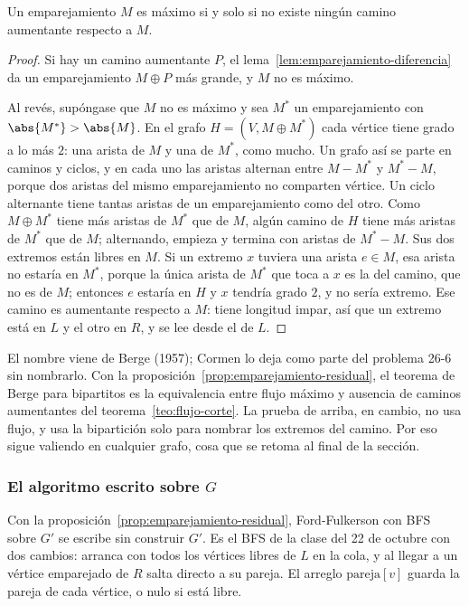 \documentclass[11pt,letterpaper]{article}
\begin{document}
\begin{teorema}[Berge]
  \label{teo:emparejamiento-berge}
  Un emparejamiento $M$ es máximo si y solo si no existe ningún
  camino aumentante respecto a $M$.
\end{teorema}

\begin{proof}
  Si hay un camino aumentante $P$, el
  lema~\ref{lem:emparejamiento-diferencia} da un emparejamiento
  $M \oplus P$ más grande, y $M$ no es máximo.

  Al revés, supóngase que $M$ no es máximo y sea $M^*$ un
  emparejamiento con $\abs{M^*} > \abs{M}$. En el grafo
  $H = (V, M \oplus M^*)$ cada vértice tiene grado a lo más $2$: una
  arista de $M$ y una de $M^*$, como mucho. Un grafo así se parte en
  caminos y ciclos, y en cada uno las aristas alternan entre
  $M - M^*$ y $M^* - M$, porque dos aristas del mismo emparejamiento
  no comparten vértice. Un ciclo alternante tiene tantas aristas de un
  emparejamiento como del otro. Como $M \oplus M^*$ tiene más aristas
  de $M^*$ que de $M$, algún camino de $H$ tiene más aristas de $M^*$
  que de $M$; alternando, empieza y termina con aristas de $M^* - M$.
  Sus dos extremos están libres en $M$. Si un extremo $x$ tuviera una
  arista $e \in M$, esa arista no estaría en $M^*$, porque la única
  arista de $M^*$ que toca a $x$ es la del camino, que no es de $M$;
  entonces $e$ estaría en $H$ y $x$ tendría grado $2$, y no sería
  extremo. Ese camino es aumentante respecto a $M$: tiene longitud
  impar, así que un extremo está en $L$ y el otro en $R$, y se lee
  desde el de $L$.
\end{proof}

El nombre viene de Berge (1957); Cormen lo deja como parte del
problema 26-6 sin nombrarlo. Con la
proposición~\ref{prop:emparejamiento-residual}, el teorema de Berge para
bipartitos es la equivalencia entre flujo máximo y ausencia de
caminos aumentantes del teorema~\ref{teo:flujo-corte}. La prueba de
arriba, en cambio, no usa flujo, y usa la bipartición solo para
nombrar los extremos del camino. Por eso sigue valiendo en cualquier
grafo, cosa que se retoma al final de la sección.

\subsubsection*{El algoritmo escrito sobre $G$}

Con la proposición~\ref{prop:emparejamiento-residual}, Ford-Fulkerson con
BFS sobre $G'$ se escribe sin construir $G'$. Es el BFS de la clase
del 22 de octubre con dos cambios: arranca con todos los vértices
libres de $L$ en la cola, y al llegar a un vértice emparejado de $R$
salta directo a su pareja. El arreglo $\text{pareja}[v]$ guarda la
pareja de cada vértice, o nulo si está libre.
\end{document}
